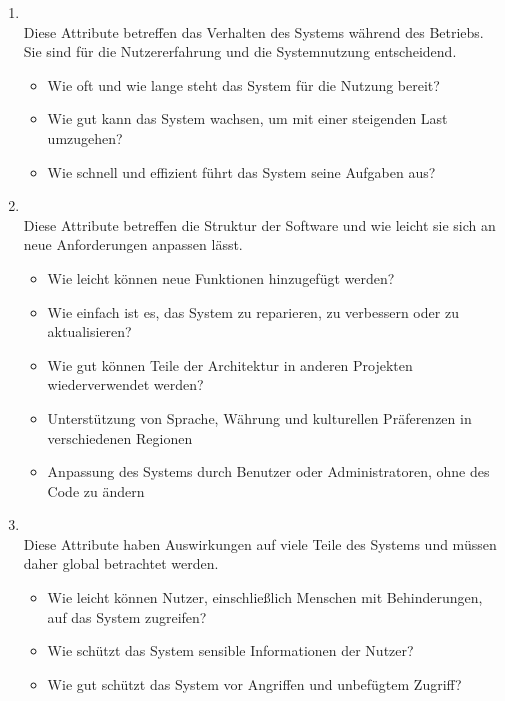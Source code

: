 \begin{infoBox}
    \begin{enumerate}
        \item {}\\
        Diese Attribute betreffen das Verhalten des Systems während des Betriebs. Sie sind für die Nutzererfahrung und die Systemnutzung entscheidend.
        \begin{itemize}
            \item {} Wie oft und wie lange steht das System für die Nutzung bereit?
            \item {} Wie gut kann das System wachsen, um mit einer steigenden Last umzugehen?
            \item {} Wie schnell und effizient führt das System seine Aufgaben aus?
        \end{itemize}
        \item {}\\
        Diese Attribute betreffen die Struktur der Software und wie leicht sie sich an neue Anforderungen anpassen lässt.
        \begin{itemize}
            \item {} Wie leicht können neue Funktionen hinzugefügt werden?
            \item {} Wie einfach ist es, das System zu reparieren, zu verbessern oder zu aktualisieren?
            \item {} Wie gut können Teile der Architektur in anderen Projekten wiederverwendet werden?
            \item {} Unterstützung von Sprache, Währung und kulturellen Präferenzen in verschiedenen Regionen
            \item {} Anpassung des Systems durch Benutzer oder Administratoren, ohne des Code zu ändern
        \end{itemize}
        \item {}\\
        Diese Attribute haben Auswirkungen auf viele Teile des Systems und müssen daher global betrachtet werden.
        \begin{itemize}
            \item {} Wie leicht können Nutzer, einschließlich Menschen mit Behinderungen, auf das System zugreifen?
            \item {} Wie schützt das System sensible Informationen der Nutzer?
            \item {} Wie gut schützt das System vor Angriffen und unbefügtem Zugriff?
        \end{itemize}
    \end{enumerate}
\end{infoBox}
